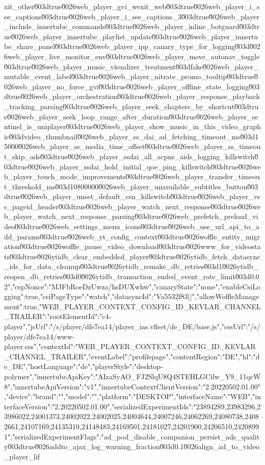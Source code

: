 {xit_other\u003dtrue\u0026web_player_gvi_wexit_web\u003dtrue\u0026web_player_i_see_captions\u003dtrue\u0026web_player_i_see_captions_3\u003dtrue\u0026web_player_include_innertube_commands\u003dtrue\u0026web_player_inline_botguard\u003dtrue\u0026web_player_innertube_playlist_update\u003dtrue\u0026web_player_innertube_share_panel\u003dtrue\u0026web_player_ipp_canary_type_for_logging\u003d\u0026web_player_live_monitor_env\u003dtrue\u0026web_player_move_autonav_toggle\u003dtrue\u0026web_player_music_visualizer_treatment\u003dfake\u0026web_player_mutable_event_label\u003dtrue\u0026web_player_nitrate_promo_tooltip\u003dtrue\u0026web_player_no_force_gvi\u003dtrue\u0026web_player_offline_state_logging\u003dtrue\u0026web_player_orchestration\u003dtrue\u0026web_player_response_playback_tracking_parsing\u003dtrue\u0026web_player_seek_chapters_by_shortcut\u003dtrue\u0026web_player_seek_loop_range_after_duration\u003dtrue\u0026web_player_sentinel_is_uniplayer\u003dtrue\u0026web_player_show_music_in_this_video_graphic\u003dvideo_thumbnail\u0026web_player_ss_dai_ad_fetching_timeout_ms\u003d15000\u0026web_player_ss_media_time_offset\u003dtrue\u0026web_player_ss_timeout_skip_ads\u003dtrue\u0026web_player_ssdai_all_acpns_aids_logging_killswitch\u003dtrue\u0026web_player_ssdai_hold_initial_qoe_ping_killswitch\u003dtrue\u0026web_player_touch_mode_improvements\u003dtrue\u0026web_player_transfer_timeout_threshold_ms\u003d10800000\u0026web_player_unavailable_subtitles_button\u003dtrue\u0026web_player_unset_default_csn_killswitch\u003dtrue\u0026web_player_vss_pageid_header\u003dtrue\u0026web_player_watch_next_response\u003dtrue\u0026web_player_watch_next_response_parsing\u003dtrue\u0026web_prefetch_preload_video\u003dtrue\u0026web_settings_menu_icons\u003dtrue\u0026web_use_url_api_to_add_params\u003dtrue\u0026web_yt_config_context\u003dtrue\u0026woffle_entity_migration\u003dtrue\u0026woffle_pause_video_download\u003dtrue\u0026www_for_videostats\u003dtrue\u0026ytidb_clear_embedded_player\u003dtrue\u0026ytidb_fetch_datasync_ids_for_data_cleanup\u003dtrue\u0026ytidb_remake_db_retries\u003d1\u0026ytidb_reopen_db_retries\u003d0\u0026ytidb_transaction_ended_event_rate_limit\u003d0.02","cspNonce":"MJFbRoeDzUwza/hsDUXwhw","canaryState":"none","enableCsiLogging":true,"csiPageType":"watch","datasyncId":"Va5532f83||","allowWoffleManagement":true},"WEB_PLAYER_CONTEXT_CONFIG_ID_KEVLAR_CHANNEL_TRAILER":{"rootElementId":"c4-player","jsUrl":"/s/player/dfe7ea14/player_ias.vflset/de_DE/base.js","cssUrl":"/s/player/dfe7ea14/www-player.css","contextId":"WEB_PLAYER_CONTEXT_CONFIG_ID_KEVLAR_CHANNEL_TRAILER","eventLabel":"profilepage","contentRegion":"DE","hl":"de_DE","hostLanguage":"de","playerStyle":"desktop-polymer","innertubeApiKey":"AIzaSyAO_FJ2SlqU8Q4STEHLGCilw_Y9_11qcW8","innertubeApiVersion":"v1","innertubeContextClientVersion":"2.20220502.01.00","device":{"brand":"","model":"","platform":"DESKTOP","interfaceName":"WEB","interfaceVersion":"2.20220502.01.00"},"serializedExperimentIds":"23894289,23983296,23986022,24001373,24002022,24002025,24004644,24007246,24062269,24080738,24082661,24107169,24135310,24148483,24169501,24181027,24201900,24206510,24208991","serializedExperimentFlags":"ad_pod_disable_companion_persist_ads_quality\u003dtrue\u0026addto_ajax_log_warning_fraction\u003d0.1\u0026align_ad_to_video_player_lif}
